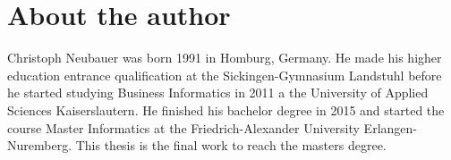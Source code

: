 %
% 
\chapter{About the author}
Christoph Neubauer was born 1991 in Homburg, Germany. He made his higher education entrance qualification at the Sickingen-Gymnasium Landstuhl before he started studying Business Informatics in 2011 a the University of Applied Sciences Kaiserslautern. He finished his bachelor degree in 2015 and started the course Master Informatics at the Friedrich-Alexander University Erlangen-Nuremberg. This thesis is the final work to reach the masters degree.